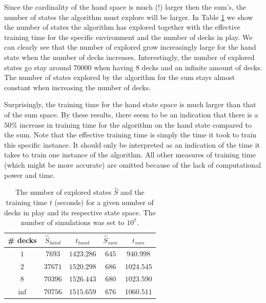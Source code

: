 Since the cardinality of the hand space is much (!) larger then the sum's, the number of states the algorithm must explore will be larger. In Table \ref{tab:state_visited} we show the number of states the algorithm has explored together with the effective training time for the specific environment and the number of decks in play. We can clearly see that the number of explored grow increasingly large for the hand state when the number of decks increases. Interestingly, the number of explored states go stay around $70 000$ when having 8 decks and an infinite amount of decks. The number of states explored by the algorithm for the sum stays almost constant when increasing the number of decks.

Surprisingly, the training time for the hand state space is much larger than that of the sum space. By these results, there seem to be an indication that there is a $50\%$ increase in training time for the algorithm on the hand state compared to the sum. Note that the effective training time is simply the time it took to train this specific instance. It should only be interpreted as an indication of the time it takes to train one instance of the algorithm. All other measures of training time (which might be more accurate) are omitted because of the lack of computational power and time.
\begin{table}[h!]
\centering
 \begin{tabular}{c|cc|cc}
  \# decks & $\hat{S}_{hand}$ & $t_{hand}$ & $\hat{S}_{sum}$ &  $t_{sum}$  \\
  \hline 
  $1$ & $7693$ & $1423.286$ & $645$ & $940.998$ \\
  $2$ & $37671$ & $1520.298$ & $686$ & $1024.545$ \\
  $8$ & $70396$ & $1526.443$ & $680$ & $1023.590$ \\
  $\inf$ & $70756$ & $1515.659$ & $676$ & $1060.511$ 
 \end{tabular} 
 \caption{The number of explored states $\hat{S}$ and the training time $t$ (seconds) for a given number of decks in play and its respective state space. The number of simulations was set to $10^7$.\label{tab:state_visited}}
\end{table}

